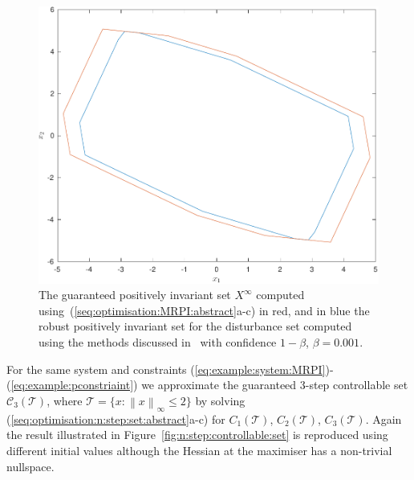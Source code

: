 \documentclass{ifacconf}
\providecommand{\norm}[1]{\left\|#1\right\|}
\providecommand{\C}{\mathscr C}
\providecommand{\T}{\mathcal T}
\begin{document}
\begin{figure}
\includegraphics[width=.95\linewidth]{MRPIsetOptimised.pdf}
\caption{The guaranteed positively invariant set $X^\infty$ computed using~(\ref{seq:optimisation:MRPI:abstract}a-c) 
in red, and in blue the robust positively invariant set for the disturbance set computed using the methods discussed in~\cite{Zhang2015} with 
confidence $1-\beta$, $\beta = 0.001$.}
\label{fig:MRPI:optimised}
\vspace{4mm}\end{figure}


For the same system and constraints (\ref{eq:example:system:MRPI})-(\ref{eq:example:pconstriaint}) we approximate the guaranteed 3-step controllable set $\C_3(\T)$, where $\T=\{x:\norm{x}_\infty\leq 2\}$
%
by solving (\ref{seq:optimisation:n:step:set:abstract}a-c) for $C_1(\T)$, $C_2(\T)$, $C_3(\T)$.
%
Again the result illustrated in Figure~\ref{fig:n:step:controllable:set} is reproduced using different initial values although the Hessian at the maximiser has a non-trivial nullspace.
%
\end{document}
